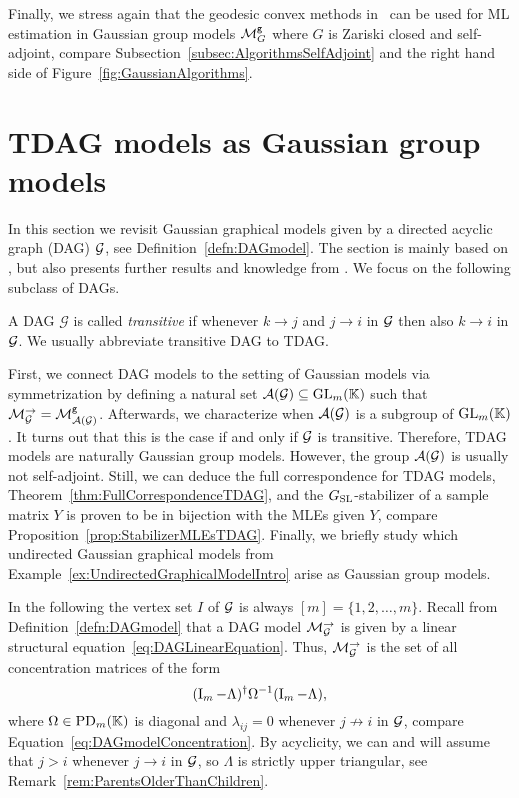 Finally, we stress again that the geodesic convex methods in~\cite{GradflowArXiv} can be used for ML estimation in Gaussian group models $\mathcal{M}^{\mathtt{g}}_G$ where $G$ is Zariski closed and self-adjoint, compare Subsection~\ref{subsec:AlgorithmsSelfAdjoint} and the right hand side of Figure~\ref{fig:GaussianAlgorithms}.





\section{TDAG models as Gaussian group models}\label{sec:TDAGs}


In this section we revisit Gaussian graphical models given by a directed acyclic graph (DAG) $\mathcal{G}$, see Definition~\ref{defn:DAGmodel}. The section is mainly based on \cite[Section~5]{SiagaPaper}, but also presents further results and knowledge from \cite{RDAG}.
We focus on the following subclass of DAGs.

\begin{defn}\label{defn:TransitiveDAG}
	A DAG $\mathcal{G}$ is called \emph{transitive} if whenever $k \to j$ and $j \to i$ in $\mathcal{G}$ then also $k \to i$ in $\mathcal{G}$. We usually abbreviate transitive DAG to TDAG.
	\hfill{}
\end{defn}

First, we connect DAG models to the setting of Gaussian models via symmetrization by defining a natural set $\mathcal{A}(\mathcal{G}) \subseteq \operatorname{GL}_m(\mathbb K)$ such that $\mathcal{M}_{\mathcal{G}}^{\to} = \mathcal{M}^{\mathtt{g}}_{\mathcal{A}(\mathcal{G})}$. Afterwards, we characterize when $\mathcal{A}(\mathcal{G})$ is a subgroup of $\operatorname{GL}_m(\mathbb K)$. It turns out that this is the case if and only if $\mathcal{G}$ is transitive. Therefore, TDAG models are naturally Gaussian group models. However, the group $\mathcal{A}(\mathcal{G})$ is usually not self-adjoint. Still, we can deduce the full correspondence for TDAG models, Theorem~\ref{thm:FullCorrespondenceTDAG}, and the $G_{\operatorname{SL}}$-stabilizer of a sample matrix $Y$ is proven to be in bijection with the MLEs given $Y$, compare Proposition~\ref{prop:StabilizerMLEsTDAG}. Finally, we briefly study which undirected Gaussian graphical models from Example~\ref{ex:UndirectedGraphicalModelIntro} arise as Gaussian group models.


\medskip

In the following the vertex set $I$ of $\mathcal{G}$ is always $[m] = \{1,2,\ldots,m\}$. Recall from Definition~\ref{defn:DAGmodel} that a DAG model $\mathcal{M}_{\mathcal{G}}^{\to}$ is given by a linear structural equation~\eqref{eq:DAGLinearEquation}. Thus, $\mathcal{M}_{\mathcal{G}}^{\to}$ is the set of all concentration matrices of the form
	\[(\operatorname{I}_m - \Lambda)^{\dagger} \Omega^{-1} (\operatorname{I}_m - \Lambda),\]
where $\Omega \in \operatorname{PD}_m(\mathbb K)$ is diagonal and $\lambda_{ij}=0$ whenever $j \not\to i$ in $\mathcal{G}$, compare Equation~\eqref{eq:DAGmodelConcentration}. By acyclicity, we can and will assume that $j > i$ whenever $j \to i$ in $\mathcal{G}$, so $\Lambda$ is strictly upper triangular, see Remark~\ref{rem:ParentsOlderThanChildren}.

